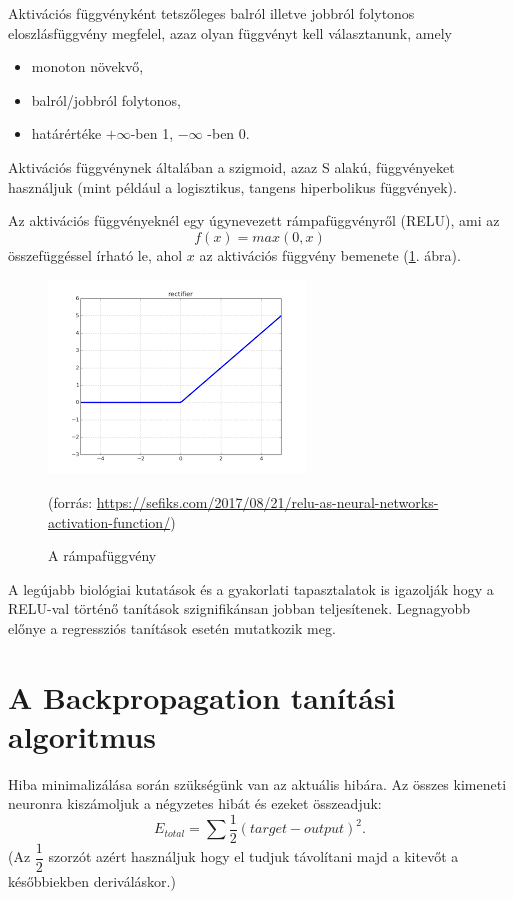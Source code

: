 Aktivációs függvényként tetszőleges balról illetve jobbról folytonos eloszlásfüggvény megfelel, azaz olyan függvényt kell választanunk, amely
\begin{itemize}
\item monoton növekvő,
\item balról/jobbról folytonos,
\item határértéke $+\infty$-ben 1, $-\infty$ -ben 0.
\end{itemize}

Aktivációs függvénynek általában a szigmoid, azaz S alakú, függvényeket használjuk (mint például a logisztikus, tangens hiperbolikus függvények).

Az aktivációs függvényeknél egy úgynevezett rámpafüggvényről (RELU), ami az
$$
f(x) = max(0,x)
$$
összefüggéssel írható le, ahol $x$ az aktivációs függvény bemenete (\ref{fig:relu}. ábra).

\begin{figure}[h]
\centering
\includegraphics[scale=1.0]{images/relu}
\caption{A rámpafüggvény}
\label{fig:relu}
(forrás: \url{https://sefiks.com/2017/08/21/relu-as-neural-networks-activation-function/})
\end{figure}

A legújabb biológiai kutatások és a gyakorlati tapasztalatok is igazolják hogy a RELU-val történő tanítások szignifikánsan jobban teljesítenek. Legnagyobb előnye a regressziós tanítások esetén mutatkozik meg.

\section{A Backpropagation tanítási algoritmus}

Hiba minimalizálása során szükségünk van az aktuális hibára. Az összes kimeneti neuronra kiszámoljuk a négyzetes hibát és ezeket összeadjuk:
$$
E_{total} = \sum \dfrac{1}{2}(target - output)^2.
$$
(Az $\dfrac{1}{2}$ szorzót azért használjuk hogy el tudjuk távolítani majd a kitevőt a későbbiekben deriváláskor.)

